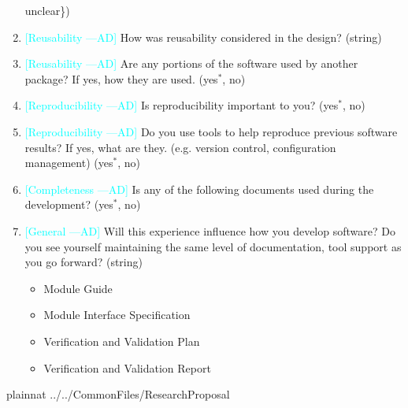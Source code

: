 \documentclass[letterpaper,cleveref]{lipics-v2019}
\newcommand{\authornote}[3]{\textcolor{#1}{[#3 ---#2]}}
\newcommand{\authornote}[3]{}
\newcommand{\ad}[1]{\authornote{cyan}{AD}{#1}} %
\theoremstyle{definition}
\begin{document}
\begin{enumerate}
unclear\})
\item \ad{Reusability} How was reusability considered in the design? (string)
\item \ad{Reusability} Are any portions of the software used by another package? If yes, how they are used. ({yes$^*$, no})
\item \ad{Reproducibility} Is reproducibility important to you? ({yes$^*$, no})
\item \ad{Reproducibility} Do you use tools to help reproduce previous software results? If yes, what are they. (e.g. version control, configuration management) ({yes$^*$, no})
\item \ad{Completeness} Is any of the following documents used during the development? ({yes$^*$, no})
\item \ad{General} Will this experience influence how you develop software? Do you see yourself maintaining the same level of documentation, tool support as you go forward? (string)
\begin{itemize}
\item Module Guide
\item Module Interface Specification
\item Verification and Validation Plan
\item Verification and Validation Report
\end{itemize}
\end{enumerate}

\newpage

 {plainnat}
 {../../CommonFiles/ResearchProposal}
\end{document}

